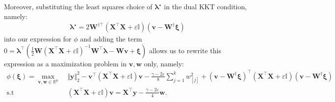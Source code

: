 \documentclass[opre,nonblindrev]{informs3} %
\begin{document}
{Moreover, substituting the least squares choice of $\bm{\lambda}^\star$ in the dual KKT condition, namely:
\begin{align*}
    \bm{\lambda}^\star =2\bm{W}^{\dag \top}\left(\bm{X}^\top \bm{X}+\varepsilon\mathbb{I}\right)(\bm{v}-\bm{W}^\dag \bm{\xi})
\end{align*}
into our expression for $\phi$ and adding the term $0=\bm{\lambda}^\top \left(\frac{1}{2}\bm{W}\left(\bm{X}^\top \bm{X}+\varepsilon\mathbb{I}\right)^{-1}\bm{W}^\top \bm{\lambda}-\bm{Wv+\xi}\right)$ allows us to rewrite this expression as
%
a maximization problem in $\bm{v,w}$ only, namely:
\begin{align*}
	\phi(\bm{\xi})=\max_{\bm{v}, \bm{w}\in \mathbb{R}^p}\;& \Vert \bm{y}\Vert_2^2-\bm{v}^\top \left(\bm{X}^\top \bm{X}+\varepsilon\mathbb{I}\right)\bm{v} - \frac{\gamma-2\varepsilon}{8} \sum_{j=1}^k w_{[j]}^2 +\left(\bm{v}-\bm{W}^\dag \bm{\xi}\right)^\top \left(\bm{X}^\top \bm{X}+\varepsilon\mathbb{I}\right)\left(\bm{v}-\bm{W}^\dag \bm{\xi}\right)\\
 \text{s.t} \quad & \left(\bm{X}^\top \bm{X}+\varepsilon\mathbb{I}\right) \bm{v}=\bm{X}^\top \bm{y}-\frac{\gamma-2\varepsilon}{4}\bm{w}.
\end{align*}

}
\end{document}
